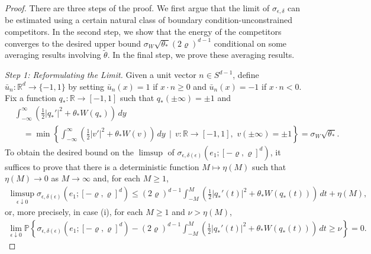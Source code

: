 \documentclass[12pt]{amsart}
\begin{document}
	\begin{proof} There are three steps of the proof.  We first argue that the limit of $\sigma_{\epsilon,\delta}$ can be estimated using a certain natural class of boundary condition-unconstrained competitors.  In the second step, we show that the energy of the competitors converges to the desired upper bound $\sigma_{W} \sqrt{ \theta_{*} } ( 2 \varrho )^{d-1}$ conditional on some averaging results involving $\tilde{\theta}$.  In the final step, we prove these averaging results.

    \textit{Step 1: Reformulating the Limit.} Given a unit vector $n \in S^{d-1}$,  define $\bar{u}_{n} : \mathbb{R}^{d} \to \{-1,1\}$ by setting $\bar{u}_{n}(x) = 1$ if $x \cdot n \geq 0$ and $\bar{u}_{n}(x) = -1$ if $x \cdot n < 0$.  Fix a function $q_{*} : \mathbb{R} \to [-1,1]$ such that $q_{*}(\pm \infty) = \pm 1$ and
		\begin{align*}
			&\int_{-\infty}^{\infty} \left( \frac{1}{2} | q_{*}' |^{2} + \theta_{*} W ( q_{*} ) \right) \, dy \\
			&\quad= \min \left\{ \int_{-\infty}^{\infty} \left( \frac{1}{2} | v' |^{2} + \theta_{*} W ( v ) \right) \, dy \, \mid \, v : \mathbb{R} \to [-1,1], \, \, v(\pm \infty) = \pm1 \right\} = \sigma_{W} \sqrt{ \theta_{*} }.
		\end{align*}
    To obtain the desired bound on the $\limsup$ of $\sigma_{\epsilon,\delta(\epsilon)}(e_{1};[-\varrho,\varrho]^{d})$, it suffices to prove that there is a deterministic function $M \mapsto \eta(M)$ such that $\eta(M) \to 0$ as $M \to \infty$ and, for each $M \geq 1$, 
        \begin{align} \label{E: limsup bound generalities}
            \limsup_{ \epsilon \downarrow 0 } \sigma_{ \epsilon, \delta(\epsilon) } ( e_{1} ; [-\varrho,\varrho]^{d} ) \leq (2 \varrho)^{d-1} \int_{-M}^{M} \left( \frac{1}{2} |q_{*}'(t)|^{2} + \theta_{*} W(q_{*}(t)) \right) \, dt + \eta(M),
        \end{align}
    or, more precisely, in case (i), for each $M \geq 1$ and $\nu > \eta(M)$,        
        \begin{align*}
            \lim_{ \epsilon \downarrow 0 } \mathbb{P} \left\{ \sigma_{ \epsilon, \delta(\epsilon) } ( e_{1} ; [-\varrho,\varrho]^{d} ) - (2 \varrho)^{d-1} \int_{-M}^{M} \left( \frac{1}{2} |q_{*}'(t)|^{2} + \theta_{*} W(q_{*}(t)) \right) \, dt \geq \nu \right\} = 0.
        \end{align*}
        

\end{proof}
\end{document}
